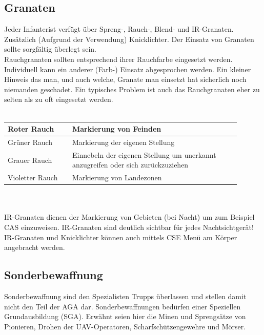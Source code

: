 \subsection{Granaten}
	Jeder Infanterist verfügt über Spreng-, Rauch-, Blend- und \acf{IR}-Granaten. Zusätzlich (Aufgrund der Verwendung) Knicklichter. Der Einsatz von Granaten sollte sorgfältig überlegt sein. \\
	Rauchgranaten sollten entsprechend ihrer Rauchfarbe eingesetzt werden. Individuell kann ein anderer (Farb-) Einsatz abgesprochen werden. Ein kleiner Hinweis das man, und auch welche, Granate man einsetzt hat sicherlich noch niemanden geschadet. Ein typisches Problem ist auch das Rauchgranaten eher zu selten als zu oft eingesetzt werden. \\
\\
\begin{tabular} {|p{0.25\linewidth}|p{0.65\linewidth}|} \hline
	Roter Rauch		& Markierung von Feinden			\\ \hline
	Grüner Rauch	& Markierung der eigenen Stellung 	\\ \hline
	Grauer Rauch	& Einnebeln der eigenen Stellung um unerkannt anzugreifen oder sich zurückzuziehen 		\\ \hline 
	Violetter Rauch & Markierung von Landezonen			\\ \hline
\end{tabular}\\
\\
\ac{IR}-Granaten dienen der Markierung von Gebieten (bei Nacht) um zum Beispiel \ac{CAS} einzuweisen. \ac{IR}-Granaten sind deutlich sichtbar für jedes Nachtsichtgerät! \ac{IR}-Granaten und Knicklichter können auch mittels \ac{CSE} Menü am Körper angebracht werden.

\subsection{Sonderbewaffnung}
	Sonderbewaffnung sind den Spezialisten Trupps überlassen und stellen damit nicht den Teil der \ac{AGA} dar. Sonderbewaffnungen bedürfen einer Speziellen Grundausbildung (\ac{SGA}). Erwähnt seien hier die Minen und Sprengsätze von Pionieren, Drohen der \ac{UAV}-Operatoren, Scharfschützengewehre und Mörser. \\


